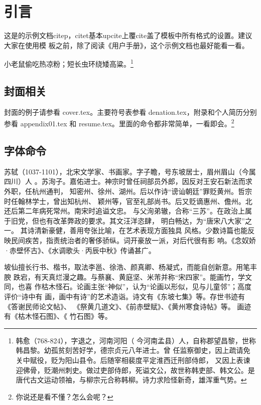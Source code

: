 

\chapter{引言}
\label{cha:intro}

这是的示例文档citep\citep{Ligorria1999}，citet\citet{Ligorria1999}基本upcite上覆cite\cite{Ligorria1999}盖了模板中所有格式的设置。建议大家在使用模
板之前，除了阅读《用户手册》，这个示例文档也最好能看一看。

小老鼠偷吃热凉粉；短长虫环绕矮高粱。\footnote{韩愈（768-824），字退之，河南河阳（
  今河南孟县）人，自称郡望昌黎，世称韩昌黎。幼孤贫刻苦好学，德宗贞元八年进士。曾
  任监察御史，因上疏请免关中赋役，贬为阳山县令。后随宰相裴度平定淮西迁刑部侍郎，
  又因上表谏迎佛骨，贬潮州刺史。做过吏部侍郎，死谥文公，故世称韩吏部、韩文公。是
  唐代古文运动领袖，与柳宗元合称韩柳。诗力求险怪新奇，雄浑重气势。}


\section{封面相关}
封面的例子请参看 cover.tex。主要符号表参看 denation.tex，附录和个人简历分别参看 appendix01.tex
和 resume.tex。里面的命令都非常简单，一看即会。\footnote{你说还是看不懂？怎么会呢？}

\section{字体命令}
\label{sec:first}

苏轼（1037-1101），北宋文学家、书画家。字子瞻，号东坡居士，眉州眉山（今属四川）人
。苏洵子。嘉佑进士。神宗时曾任祠部员外郎，因反对王安石新法而求外职，任杭州通判，
知密州、徐州、湖州。后以作诗“谤讪朝廷”罪贬黄州。哲宗时任翰林学士，曾出知杭州、
颖州等，官至礼部尚书。后又贬谪惠州、儋州。北还后第二年病死常州。南宋时追谥文忠。
与父洵弟辙，合称“三苏”。在政治上属于旧党，但也有改革弊政的要求。其文汪洋恣肆，
明白畅达，为“唐宋八大家”之一。  其诗清新豪健，善用夸张比喻，在艺术表现方面独具
风格。少数诗篇也能反映民间疾苦，指责统治者的奢侈骄纵。词开豪放一派，对后代很有影
响。《念奴娇·赤壁怀古》、《水调歌头·丙辰中秋》传诵甚广。

{\kaishu 坡仙擅长行书、楷书，取法李邕、徐浩、颜真卿、杨凝式，而能自创新意。用笔丰腴
  跌宕，有天真烂漫之趣。与蔡襄、黄庭坚、米芾并称“宋四家”。能画竹，学文同，也喜
  作枯木怪石。论画主张“神似”，认为“论画以形似，见与儿童邻”；高度评价“诗中有
  画，画中有诗”的艺术造诣。诗文有《东坡七集》等。存世书迹有《答谢民师论文帖》、
  《祭黄几道文》、《前赤壁赋》、《黄州寒食诗帖》等。  画迹有《枯木怪石图》、《
  竹石图》等。}


